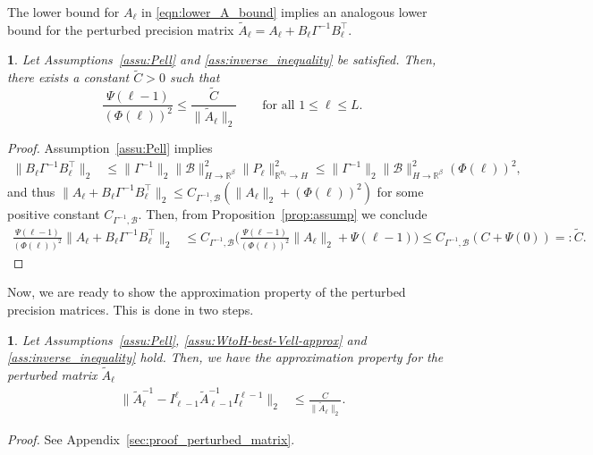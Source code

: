 \documentclass[11pt,english]{article}
\theoremstyle{plain}
\theoremstyle{plain}
\newtheorem{prop}[thm]{\protect\propositionname}
\theoremstyle{plain}
\theoremstyle{plain}
\numberwithin{equation}{section}
\providecommand{\propositionname}{Proposition}
\begin{document}
The lower bound for $A_{\ell}$ in \eqref{eqn:lower_A_bound} implies an analogous lower bound for the perturbed precision matrix $\widetilde{A}_{\ell}=A_{\ell}+B_{\ell}\Gamma^{-1}B_{\ell}^{\top}$.
\begin{prop}
	\label{prop:1/tildeAll-lb} Let Assumptions~\ref{assu:Pell} and \ref{ass:inverse_inequality} be satisfied. Then, there exists a constant $\tilde{C}>0$ such that 
	\begin{equation}
          \frac{\Psi(\ell-1)}{(\Phi(\ell))^{2}}\leq\frac{\tilde{C}}{\|\widetilde{A}_{\ell}\|_{2}}
          \qquad\text{for all $1\leq \ell\leq L$.}\label{eq:inv-norm-bound}
	\end{equation}
\end{prop}
\begin{proof}
	Assumption~\ref{assu:Pell} implies
	\begin{align*}
		\|B_{\ell}\Gamma^{-1}B_{\ell}^{\top}\|_{2} & \leq\|\Gamma^{-1}\|_{2}\|\mathcal{B}\|_{H\to\mathbb{R}^{\beta}}^{2}\|P_{\ell}\|_{\mathbb{R}^{n_{\ell}}\to H}^{2}\leq\|\Gamma^{-1}\|_{2}\|\mathcal{B}\|_{H\to\mathbb{R}^{\beta}}^{2}(\Phi(\ell))^{2},
	\end{align*}
	and thus $\|A_{\ell}+B_{\ell}\Gamma^{-1}B_{\ell}^{\top}\|_{2}\leq C_{\Gamma^{-1},\mathcal{B}}(\|A_{\ell}\|_{2}+(\Phi(\ell))^{2})$ for some positive constant $C_{\Gamma^{-1},\mathcal{B}}$.
	Then, from Proposition~\ref{prop:assump} we conclude
	\begin{align*}
		\frac{\Psi(\ell-1)}{(\Phi(\ell))^{2}}\|A_{\ell}+B_{\ell}\Gamma^{-1}B_{\ell}^{\top}\|_{2} & \leq C_{\Gamma^{-1},\mathcal{B}}\Bigg(\frac{\Psi(\ell-1)}{(\Phi(\ell))^{2}}\|A_{\ell}\|_{2}+\Psi(\ell-1)\Bigg) \leq C_{\Gamma^{-1},\mathcal{B}}(C+\Psi(0))=:\tilde{C}.
	\end{align*}
\end{proof}
\noindent
Now, we are ready to show the approximation property of the perturbed
precision matrices. This is done in two steps.
\begin{prop}
	\label{prop:approximation-property}Let Assumptions~\ref{assu:Pell}, \ref{assu:WtoH-best-Vell-approx} and \ref{ass:inverse_inequality} hold. Then, we have the approximation property for the perturbed matrix $\widetilde{A}_{\ell}$
	\begin{align*}
		\|\widetilde{A}_{\ell}^{-1}-I_{\ell-1}^{\ell}\widetilde{A}_{\ell-1}^{-1}I_{\ell}^{\ell-1}\|_{2}
		 & \leq\frac{C}{\|\widetilde{A}_{\ell}\|_{2}}.
	\end{align*}
\end{prop}
\noindent\textit{Proof.} See Appendix~\ref{sec:proof_perturbed_matrix}.\\[1ex]
\end{document}
